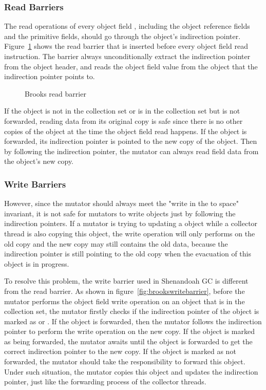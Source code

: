 \subsubsection{Read Barriers}

The read operations of every object field , including the object
reference fields and the primitive fields, should go through the object's indirection pointer.
Figure~\ref{fig:brooksreadbarrier} shows the read barrier that is inserted before every object field read instruction.
The barrier always unconditionally extract the indirection pointer from the object header,
and reads the object field value from the object that the indirection pointer points to.

\begin{figure}
  \centering
  
  \caption{Brooks read barrier}
  \label{fig:brooksreadbarrier}
\end{figure}

If the object is not in the collection set or is in the collection set but is not forwarded,
reading data from its original copy is safe since there is no other copies of the object
at the time the object field read happens.
If the object is forwarded, its indirection pointer is pointed to the new copy of the object.
Then by following the indirection pointer, the mutator can always read field data from the object's new copy.

\subsubsection{Write Barriers}

However, since the mutator should always meet the "write in the to space" invariant,
it is not safe for mutators to write objects just by following the indirection pointers.
If a mutator is trying to updating a object while a collector thread is also copying
this object, the write operation will only performs on the old copy and the new copy may still contains the
old data, because the indirection pointer is still pointing to the old copy when
the evacuation of this object is in progress.

To resolve this problem, the write barrier used in Shenandoah GC is different from the
read barrier. As shown in figure~\ref{fig:brookswritebarrier}, before the mutator
performs the object field write operation on an object that is in the collection set,
the mutator firstly checks if the indirection pointer of the object is marked as 
or . If the object is forwarded, then the mutator follows
the indirection pointer to perform the write operation on the new copy.
If the object is marked as being forwarded, the mutator awaits until the object is forwarded to
get the correct indirection pointer to the new copy.
If the object is marked as not forwarded, the mutator should take the responsibility to forward this object.
Under such situation, the mutator copies this object and updates the indirection pointer,
just like the forwarding process of the collector threads.

